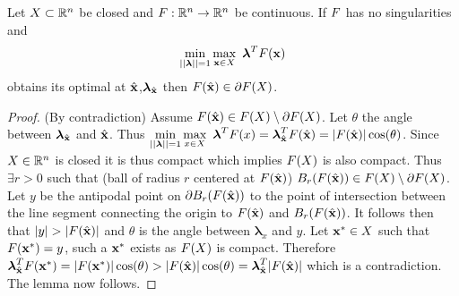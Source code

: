\begin{lem} 
\label{lem:BdOpt}
Let $X\subset\mathbb{R}^n$ be closed and $F:\mathbb{R}^n\rightarrow\mathbb{R}^n$ be continuous. 
If $F$ has no singularities and $$\min\limits_{||\boldsymbol{\lambda}||=1}\max\limits_{\mathbf{x}\in X}\ \boldsymbol{\lambda}^TF(\mathbf{x})$$
obtains its optimal at $\hat{\mathbf{x}}$,$\boldsymbol{\lambda}_{\hat{\mathbf{x}}}$ then $F(\hat{\mathbf{x}})\in \partial F(X)$. 


\begin{proof} 
(By contradiction) Assume $F(\hat{\mathbf{x}})\in F(X)\setminus\partial F(X)$. 
Let $\theta$ the angle between $\boldsymbol{\lambda}_{\hat{\mathbf{x}}}$ and $\hat{\mathbf{x}}$. 
Thus $\min\limits_{||\boldsymbol{\lambda}||=1}\max\limits_{x\in X}\ \boldsymbol{\lambda}^T\vF(x)=\boldsymbol{\lambda}_{\hat{\vx}}^T\vF(\hat{\vx})=|\vF(\hat{\vx})|\cos(\theta)$. 
Since $X\in\mathbb{R}^n$ is closed it is thus compact which implies $F(X)$ is also compact. 
Thus $\exists r>0$ such that (ball of radius $r$ centered at $F(\hat{\mathbf{x}})$) $B_r(F(\hat{\mathbf{x}}))\in F(X)\setminus\partial F(X)$. 
Let $y$ be the antipodal point on $\partial B_r(F(\hat{\mathbf{x}}))$ to the point of intersection between the line segment connecting the origin to $F(\hat{\mathbf{x}})$ and $B_r(F(\hat{\mathbf{x}}))$. 
It follows then that $|y|>|\vF(\hat{\vx})|$ and $\theta$ is the angle between $\boldsymbol{\lambda}_x$ and $y$.   
Let $\mathbf{x}^*\in X$ such that $F(\mathbf{x}^*)=y$, such a $\mathbf{x}^*$ exists as $F(X)$ is compact. 
Therefore $\boldsymbol{\lambda}_{\hat{\mathbf{x}}}^TF(\mathbf{x}^*)=|F(\mathbf{x}^*)|\cos(\theta)>|F(\hat{\mathbf{x}})|\cos(\theta)=\boldsymbol{\lambda}_{\hat{\mathbf{x}}}^T|F(\hat{\mathbf{x}})|$ which is a contradiction. 
The lemma now follows.
\end{proof}
\end{lem}


